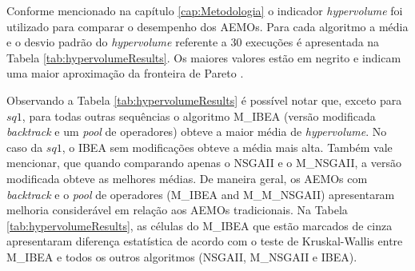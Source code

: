 Conforme mencionado na capítulo \ref{cap:Metodologia} o indicador \textit{hypervolume} foi utilizado para comparar o desempenho dos AEMOs. Para cada algoritmo a média e o desvio padrão do \textit{hypervolume}  referente a 30 execuções é apresentada na Tabela \ref{tab:hypervolumeResults}. Os maiores valores estão em negrito e indicam uma maior aproximação da fronteira de Pareto \cite{barr1998economics}.

Observando a Tabela \ref{tab:hypervolumeResults} é possível notar que, exceto para $sq1$, para todas outras sequências o algoritmo M\_IBEA (versão modificada \textit{backtrack} e um \textit{pool} de operadores) obteve a maior média de \textit{hypervolume}. No caso da $sq1$, o IBEA sem modificações obteve a média mais alta. Também vale mencionar, que quando comparando apenas o NSGAII e o M\_NSGAII, a versão modificada obteve as melhores médias. De maneira geral, os AEMOs com \textit{backtrack} e o \textit{pool} de operadores (M\_IBEA and M\_M_NSGAII) apresentaram melhoria considerável em relação aos AEMOs tradicionais. Na Tabela \ref{tab:hypervolumeResults}, as células do M\_IBEA que estão marcados de cinza apresentaram diferença estatística de acordo com o teste de  Kruskal-Wallis \cite{mckight2010kruskal} entre M\_IBEA e todos os outros algoritmos (NSGAII, M\_NSGAII e IBEA).


